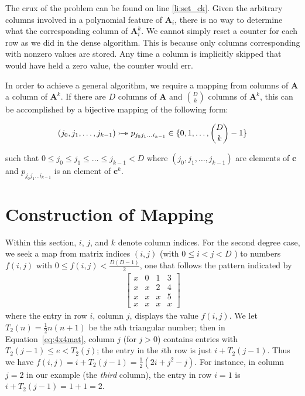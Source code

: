 \documentclass{article} %
\begin{document}
The crux of the problem can be found on line \ref{li:set_ck}.
Given the arbitrary columns involved in a polynomial feature of $\bm{A}_i$, there is no way to determine what the corresponding column of $\bm{A}^k_i$.
We cannot simply reset a counter for each row as we did in the dense algorithm.
This is because only columns corresponding with nonzero values are stored.
Any time a column is implicitly skipped that would have held a zero value, the counter would err.

In order to achieve a general algorithm, we require a mapping from columns of $\bm{A}$ a column of $\bm{A}^k$.
If there are $D$ columns of $\bm{A}$ and $\binom{D}{k}$ columns of $\bm{A}^k$, this can be accomplished by a bijective mapping of the following form:

\begin{equation}
(j_0, j_1, \dots, j_{k-1}) \rightarrowtail \hspace{-1.9ex} \twoheadrightarrow p_{j_0j_1 \dots i_{k-1}} \in \{0,1,\dots,\binom{D}{k}-1\} 
\end{equation}

such that $ 0 \le j_0 \le j_1 \le \dots \le j_{k-1} < D$
where $(j_0, j_1, \dots, j_{k-1})$ are elements of $\bm{c}$ and $p_{j_0j_1 \dots i_{k-1}}$ is an element of $\bm{c}^k$. %

\section{Construction of Mapping}
Within this section, $i$, $j$, and $k$ denote column indices.
For the second degree case, we seek a map from matrix indices $(i, j)$ (with $0 \le i < j < D$ ) to numbers $f(i, j)$ with $0 \le f(i, j) < \frac{D(D-1)}{2}$, one that follows the pattern indicated by 
\begin{align}
\begin{bmatrix}
x & 0 & 1 & 3 \\
x & x & 2 & 4 \\
x & x & x & 5 \\
x & x & x & x
\end{bmatrix}
\label{eq:4x4mat}
\end{align}
where the entry in row $i$, column $j$, displays the value $f(i, j)$. We let $T_2(n) = \frac{1}{2} n(n+1)$ 
be the $n$th triangular number; then in Equation~\ref{eq:4x4mat}, column $j$ (for $j > 0$) contains entries with  
$T_2(j-1) \le e < T_2(j)$; the entry in the $i$th row is just $i + T_2(j-1)$. Thus we have
$
f(i, j) 
= i + T_2(j-1) =  \frac{1}{2}(2i + j^2-j).$
For instance, in column $j = 2$ in our example (the \emph{third} column), the entry in row $i = 1$ is 
$i + T_2(j-1) = 1 + 1 = 2$. 
\end{document}
